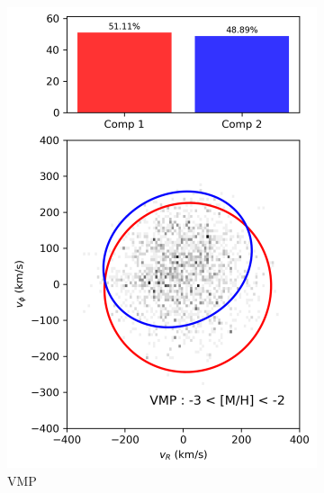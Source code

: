 \documentclass[a4paper,10pt]{article}
\begin{document}
\begin{multicols}{2}
\begin{figure}[H]
  \centering
  \begin{subfigure}[t]{0.24\linewidth}
    \includegraphics[width=\linewidth]{../figures/gmm_VMP.png}
    \caption{VMP}
    \label{fig:gmm_vmp}
  \end{subfigure}
  \hfill
  \begin{subfigure}[t]{0.24\linewidth}

\end{subfigure}
\end{figure}
\end{multicols}
\end{document}
